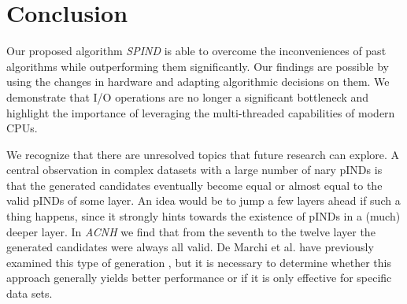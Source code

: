 \chapter{Conclusion}
Our proposed algorithm \textit{SPIND} is able to overcome the inconveniences of past algorithms while outperforming them significantly. Our findings are possible by using the changes in hardware and adapting algorithmic decisions on them. We demonstrate that I/O operations are no longer a significant bottleneck and highlight the importance of leveraging the multi-threaded capabilities of modern CPUs.

We recognize that there are unresolved topics that future research can explore. A central observation in complex datasets with a large number of nary pINDs is that the generated candidates eventually become equal or almost equal to the valid pINDs of some layer. An idea would be to jump a few layers ahead if such a thing happens, since it strongly hints towards the existence of pINDs in a (much) deeper layer. In \textit{ACNH} we find that from the seventh to the twelve layer the generated candidates were always all valid. De Marchi et al. have previously examined this type of generation \cite{de2003zigzag}, but it is necessary to determine whether this approach generally yields better performance or if it is only effective for specific data sets. 

